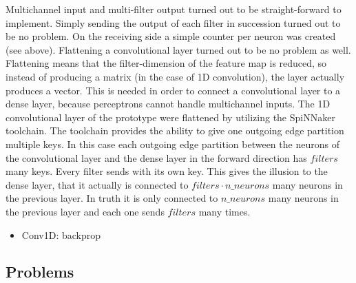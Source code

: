 \documentclass[]{article}
\begin{document}
Multichannel input and multi-filter output turned out to be
straight-forward to implement.
Simply sending the output of each filter in succession turned out to
be no problem.
On the receiving side a simple counter per neuron was created
(see above).
Flattening a convolutional layer turned out to be no problem as well.
Flattening means that the filter-dimension of the feature map is
reduced, so instead of producing a matrix (in the case of 1D
convolution), the layer actually produces a vector.
This is needed in order to connect a convolutional layer to a dense
layer, because perceptrons cannot handle multichannel inputs.
The 1D convolutional layer of the prototype were flattened by
utilizing the SpiNNaker toolchain.
The toolchain provides the ability to give one outgoing edge partition
multiple keys.
In this case each outgoing edge partition between the neurons of the
convolutional layer and the dense layer in the forward direction has
$filters$ many keys.
Every filter sends with its own key.
This gives the illusion to the dense layer, that it actually is
connected to $filters \cdot n\_neurons$ many neurons in the previous
layer.
In truth it is only connected to $n\_neurons$ many neurons in the
previous layer and each one sends $filters$ many times.



\begin{itemize}
  \item Conv1D: backprop
\end{itemize}



\subsection{Problems} %
\label{subsec:problems}
\end{document}
